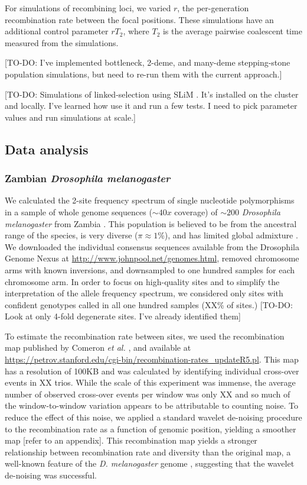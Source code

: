 \documentclass[11pt, letterpaper]{article}   	%
\begin{document}
For simulations of recombining loci, we varied $r$, the per-generation recombination rate between the focal positions.
These simulations have an additional control parameter $rT_2$, where $T_2$ is the average pairwise coalescent time measured from the simulations.

[TO-DO: I've implemented bottleneck, 2-deme, and many-deme stepping-stone population simulations, but need to re-run them with the current approach.]

[TO-DO: Simulations of linked-selection using SLiM \cite{slim:paper}. It's installed on the cluster and locally. I've learned how use it and run a few tests. I need to pick parameter values and run simulations at scale.] 

\subsection{Data analysis}

\subsubsection{Zambian \textit{Drosophila melanogaster}}

We calculated the 2-site frequency spectrum of single nucleotide polymorphisms in a sample of whole genome sequences ($\sim40x$ coverage) of $\sim200$ \textit{Drosophila melanogaster} from Zambia \cite{}.
This population is believed to be from the ancestral range of the species, is very diverse ($\pi \approx 1\%$), and has limited global admixture \cite{}.
We downloaded the individual consensus sequences available from the Drosophila Genome Nexus at \url{http://www.johnpool.net/genomes.html}, removed chromosome arms with known inversions, and downsampled to one hundred samples for each chromosome arm.
In order to focus on high-quality sites and to simplify the interpretation of the allele frequency spectrum, we considered only sites with confident genotypes called in all one hundred samples (XX\% of sites.)
[TO-DO: Look at only 4-fold degenerate sites. I've already identified them]

To estimate the recombination rate between sites, we used the recombination map published by Comeron \textit{et al.} \cite{}, and available at \url{https://petrov.stanford.edu/cgi-bin/recombination-rates_updateR5.pl}.
This map has a resolution of 100KB and was calculated by identifying individual cross-over events in XX trios.
While the scale of this experiment was immense, the average number of observed cross-over events per window was only XX and so much of the window-to-window variation appears to be attributable to counting noise.
To reduce the effect of this noise, we applied a standard wavelet de-noising procedure \cite{} to the recombination rate as a function of genomic position, yielding a smoother map [refer to an appendix].
This recombination map yields a stronger relationship between recombination rate and diversity than the original map, a well-known feature of the \textit{D. melanogaster} genome \cite{begun:aquadro, etc}, suggesting that the wavelet de-noising was successful.
\end{document}
